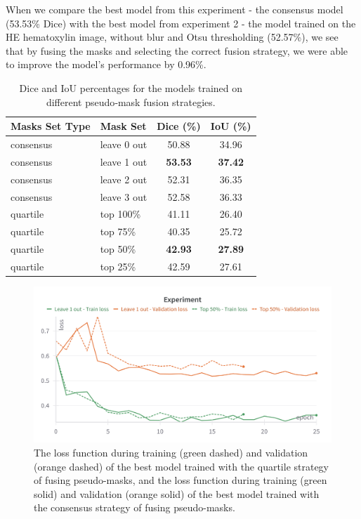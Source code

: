 When we compare the best model from this experiment - the consensus model (53.53\% Dice) with the best model from experiment 2 - the model trained on the HE hematoxylin image, without blur and Otsu thresholding (52.57\%), we see that by fusing the masks and selecting the correct fusion strategy, we were able to improve the model's performance by 0.96\%.

\begin{table}[H]
  \centering
  \begin{tabular}{ l | l | c | c } 
    \hline
    \textbf{Masks Set Type} & \textbf{Mask Set} & \textbf{Dice (\%)} & \textbf{IoU (\%)} \\
    \hline
      consensus & leave 0 out & 50.88 & 34.96 \\
      consensus & leave 1 out & \textbf{53.53} & \textbf{37.42} \\
      consensus & leave 2 out & 52.31 & 36.35 \\
      consensus & leave 3 out & 52.58 & 36.33 \\
    \hline
      quartile  & top 100\%   & 41.11 & 26.40 \\
      quartile  & top 75\%    & 40.35 & 25.72 \\
      quartile  & top 50\%    & \textbf{42.93} & \textbf{27.89} \\
      quartile  & top 25\%    & 42.59 & 27.61 \\
    \hline
  \end{tabular}
  \caption{Dice and IoU percentages for the models trained on different pseudo‐mask fusion strategies.}
  \label{tab:fusion-strategies}
\end{table}

\begin{figure}[H]
\begin{centering}
\includegraphics[width=\textwidth]{assets/images/for_presentation/exp3-loss.png}
\par\end{centering}
\caption{The loss function during training (green dashed) and validation (orange dashed) of the best model trained with the quartile strategy of fusing pseudo-masks, and the loss function during training (green solid) and validation (orange solid) of the best model trained with the consensus strategy of fusing pseudo-masks.
\label{fig:exp3-loss}}
\end{figure}

